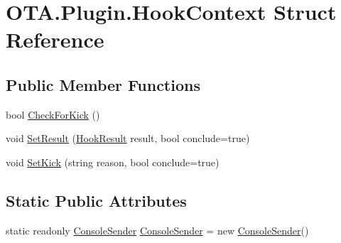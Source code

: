 \hypertarget{struct_o_t_a_1_1_plugin_1_1_hook_context}{}\section{O\+T\+A.\+Plugin.\+Hook\+Context Struct Reference}
\label{struct_o_t_a_1_1_plugin_1_1_hook_context}
\subsection*{Public Member Functions}
\begin{DoxyCompactItemize}
\item 
bool \hyperlink{struct_o_t_a_1_1_plugin_1_1_hook_context_aa9f09869d631ea8780da4cd67f304e76}{Check\+For\+Kick} ()
\item 
void \hyperlink{struct_o_t_a_1_1_plugin_1_1_hook_context_a49832ff5817d9a08d641cd95ce481076}{Set\+Result} (\hyperlink{namespace_o_t_a_1_1_plugin_aa8957fb16676ac9d82aba4aec342737f}{Hook\+Result} result, bool conclude=true)
\item 
void \hyperlink{struct_o_t_a_1_1_plugin_1_1_hook_context_aa0eb14d7df5d26237ce3af350b417f6a}{Set\+Kick} (string reason, bool conclude=true)
\end{DoxyCompactItemize}
\subsection*{Static Public Attributes}
\begin{DoxyCompactItemize}
\item 
static readonly \hyperlink{class_o_t_a_1_1_command_1_1_console_sender}{Console\+Sender} \hyperlink{struct_o_t_a_1_1_plugin_1_1_hook_context_a401b933e841cfa52d021cb96d77c78ee}{Console\+Sender} = new \hyperlink{class_o_t_a_1_1_command_1_1_console_sender}{Console\+Sender}()
\end{DoxyCompactItemize}
